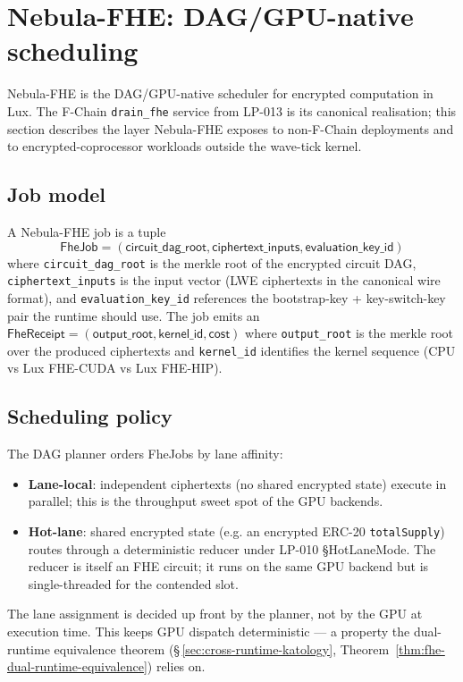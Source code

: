 \section{Nebula-FHE: DAG/GPU-native scheduling}
\label{sec:nebula-fhe-scheduling}

Nebula-FHE is the DAG/GPU-native scheduler for encrypted computation
in Lux. The F-Chain \texttt{drain\_fhe} service from LP-013 is its
canonical realisation; this section describes the layer Nebula-FHE
exposes to non-F-Chain deployments and to encrypted-coprocessor
workloads outside the wave-tick kernel.

\subsection{Job model}

A Nebula-FHE job is a tuple
\[
  \mathsf{FheJob} = (\mathsf{circuit\_dag\_root},
  \mathsf{ciphertext\_inputs},
  \mathsf{evaluation\_key\_id})
\]
where \texttt{circuit\_dag\_root} is the merkle root of the encrypted
circuit DAG, \texttt{ciphertext\_inputs} is the input vector (LWE
ciphertexts in the canonical wire format), and \texttt{evaluation\_key\_id}
references the bootstrap-key + key-switch-key pair the runtime should
use. The job emits an $\mathsf{FheReceipt} = (\mathsf{output\_root},
\mathsf{kernel\_id}, \mathsf{cost})$ where \texttt{output\_root} is the
merkle root over the produced ciphertexts and \texttt{kernel\_id}
identifies the kernel sequence (CPU vs Lux FHE-CUDA vs Lux FHE-HIP).

\subsection{Scheduling policy}

The DAG planner orders FheJobs by lane affinity:

\begin{itemize}
\item \textbf{Lane-local}: independent ciphertexts (no shared
encrypted state) execute in parallel; this is the throughput sweet spot
of the GPU backends.
\item \textbf{Hot-lane}: shared encrypted state (e.g. an encrypted
ERC-20 \texttt{totalSupply}) routes through a deterministic reducer
under LP-010 \S HotLaneMode. The reducer is itself an FHE circuit; it
runs on the same GPU backend but is single-threaded for the contended
slot.
\end{itemize}

The lane assignment is decided up front by the planner, not by the
GPU at execution time. This keeps GPU dispatch deterministic --- a
property the dual-runtime equivalence theorem
(\S\,\ref{sec:cross-runtime-katology}, Theorem~\ref{thm:fhe-dual-runtime-equivalence})
relies on.

